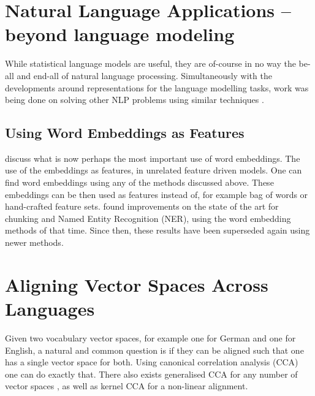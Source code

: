 \documentclass[parskip]{komatufte}
\begin{document}
\section{Natural Language Applications -- beyond language modeling}
While statistical language models are useful, they are of-course in no way the be-all and end-all of natural language processing.
Simultaneously with the developments around representations for the language modelling tasks, work was being done on solving other NLP problems using similar techniques .


\subsection{Using Word Embeddings as Features}


 discuss what is now perhaps the most important use of word embeddings.
The use of the embeddings as features, in unrelated feature driven models.
One can find word embeddings using any of the methods discussed above.
These embeddings can be then used as features instead of, for example bag of words or hand-crafted feature sets.
\textcite{turian2010word} found improvements on the state of the art for chunking and Named Entity Recognition (NER), using the word embedding methods of that time.
Since then, these results have been superseded again using newer methods.


\section{Aligning Vector Spaces Across Languages}\label{sec:aligning-vector-spaces-across-languages}
Given two vocabulary vector spaces, for example one for German and one for English,
a natural and common question is if they can be aligned such that one has a single vector space for both.
Using canonical correlation analysis (CCA) one can do exactly that.
There also exists generalised CCA for any number of vector spaces ,
as well as kernel CCA for a non-linear alignment.
\end{document}
